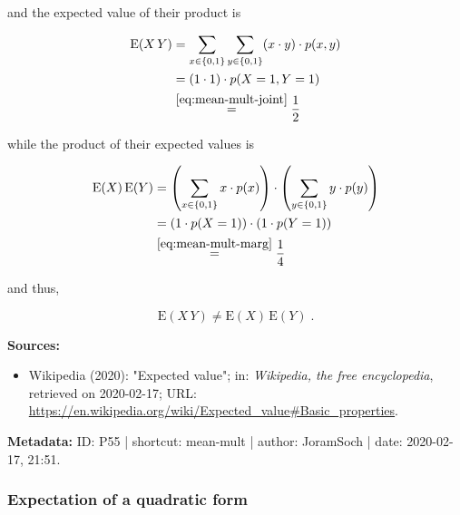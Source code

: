 \documentclass[a4paper,12pt,twoside]{book}
\begin{document}
and the expected value of their product is

\begin{equation} \label{eq:mean-mult-mean-prod}
\begin{split}
\mathrm{E}(X\,Y) &= \sum_{x \in \left\lbrace 0,1 \right\rbrace} \sum_{y \in \left\lbrace 0,1 \right\rbrace} (x \cdot y) \cdot p(x,y) \\
&= (1 \cdot 1) \cdot p(X=1, Y=1) \\
&\overset{\eqref{eq:mean-mult-joint}}{=} \frac{1}{2}
\end{split}
\end{equation}

while the product of their expected values is

\begin{equation} \label{eq:mean-mult-prod-mean}
\begin{split}
\mathrm{E}(X) \, \mathrm{E}(Y) &= \left( \sum_{x \in \left\lbrace 0,1 \right\rbrace} x \cdot p(x) \right) \cdot \left( \sum_{y \in \left\lbrace 0,1 \right\rbrace} y \cdot p(y) \right) \\
&= \left( 1 \cdot p(X=1) \right) \cdot \left( 1 \cdot p(Y=1) \right) \\
&\overset{\eqref{eq:mean-mult-marg}}{=} \frac{1}{4}
\end{split}
\end{equation}

and thus,

\begin{equation} \label{eq:mean-mult-mean-nonmult-qed}
\mathrm{E}(X\,Y) \neq \mathrm{E}(X) \, \mathrm{E}(Y) \; .
\end{equation}


\vspace{1em}
\textbf{Sources:}
\begin{itemize}
\item Wikipedia (2020): "Expected value"; in: \textit{Wikipedia, the free encyclopedia}, retrieved on 2020-02-17; URL: \url{https://en.wikipedia.org/wiki/Expected_value#Basic_properties}.
\end{itemize}


\vspace{1em}
\textbf{Metadata:} ID: P55 | shortcut: mean-mult | author: JoramSoch | date: 2020-02-17, 21:51.
\vspace{1em}



\subsubsection[\textbf{Expectation of a quadratic form}]{Expectation of a quadratic form} \label{sec:mean-qf}
\setcounter{equation}{0}
\end{document}
